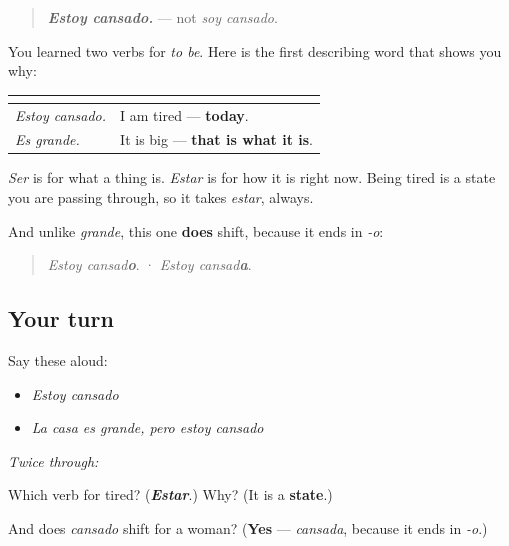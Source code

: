 \begin{grammarlens}[title={Grammar Lens: the state, not the quality}]
\begin{quote}
\emph{\textbf{Estoy cansado.}} — not \emph{soy cansado}.
\end{quote}

You learned two verbs for \emph{to be}. Here is the first describing word that shows you why:

\noindent
\begin{tabularx}{\linewidth}{@{}>{\raggedright\arraybackslash}X>{\raggedright\arraybackslash}X@{}}
\toprule
\textbf{} & \textbf{} \\
\midrule
\emph{Estoy cansado.} & I am tired — \textbf{today}. \\
\emph{Es grande.} & It is big — \textbf{that is what it is}. \\
\bottomrule
\end{tabularx}

\emph{Ser} is for what a thing is. \emph{Estar} is for how it is right now. Being tired is a state you are passing through, so it takes \emph{estar}, always.

And unlike \emph{grande}, this one \textbf{does} shift, because it ends in \emph{-o}:

\begin{quote}
\emph{Estoy cansad\textbf{o}}.  ·  \emph{Estoy cansad\textbf{a}}.
\end{quote}
\end{grammarlens}

\subsection*{Your turn}
Say these aloud:

\begin{itemize}
\raggedright
  \item \emph{Estoy cansado}
  \item \emph{La casa es grande, pero estoy cansado}
\end{itemize}

\emph{Twice through:}

\begin{tcolorbox}[breakable,colback=teal!4,colframe=teal!35!black,title={Before you move on}]
Which verb for tired? (\emph{\textbf{Estar}}.) Why? (It is a \textbf{state}.)

And does \emph{cansado} shift for a woman? (\textbf{Yes} — \emph{cansada}, because it ends in \emph{-o}.)
\end{tcolorbox}
